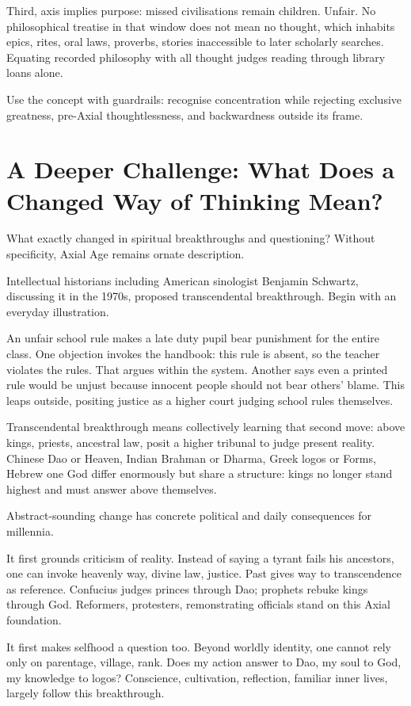 Third, axis implies purpose: missed civilisations remain children. Unfair. No philosophical treatise in that window does not mean no thought, which inhabits epics, rites, oral laws, proverbs, stories inaccessible to later scholarly searches. Equating recorded philosophy with all thought judges reading through library loans alone.

Use the concept with guardrails: recognise concentration while rejecting exclusive greatness, pre-Axial thoughtlessness, and backwardness outside its frame.

\section[Further Challenge: A New Way to Think?]{A Deeper Challenge: What Does a Changed Way of Thinking Mean?}
What exactly changed in spiritual breakthroughs and questioning? Without specificity, Axial Age remains ornate description.

Intellectual historians including American sinologist Benjamin Schwartz, discussing it in the 1970s, proposed transcendental breakthrough. Begin with an everyday illustration.

An unfair school rule makes a late duty pupil bear punishment for the entire class. One objection invokes the handbook: this rule is absent, so the teacher violates the rules. That argues within the system. Another says even a printed rule would be unjust because innocent people should not bear others' blame. This leaps outside, positing justice as a higher court judging school rules themselves.

Transcendental breakthrough means collectively learning that second move: above kings, priests, ancestral law, posit a higher tribunal to judge present reality. Chinese Dao or Heaven, Indian Brahman or Dharma, Greek logos or Forms, Hebrew one God differ enormously but share a structure: kings no longer stand highest and must answer above themselves.

Abstract-sounding change has concrete political and daily consequences for millennia.

It first grounds criticism of reality. Instead of saying a tyrant fails his ancestors, one can invoke heavenly way, divine law, justice. Past gives way to transcendence as reference. Confucius judges princes through Dao; prophets rebuke kings through God. Reformers, protesters, remonstrating officials stand on this Axial foundation.

It first makes selfhood a question too. Beyond worldly identity, one cannot rely only on parentage, village, rank. Does my action answer to Dao, my soul to God, my knowledge to logos? Conscience, cultivation, reflection, familiar inner lives, largely follow this breakthrough.

